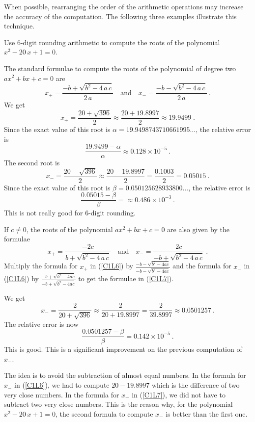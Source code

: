 When possible, rearranging the order of the arithmetic operations may
increase the accuracy of the computation.  The following three examples
illustrate this technique.

\begin{egg}
Use $6$-digit rounding arithmetic to compute the roots of the
polynomial $x^2-20\,x+1=0$.

The standard formulae to compute the
roots of the polynomial of degree two $a x^2+b x+c=0$ are
\begin{equation}
x_{+} =\frac{-b+\sqrt{b^2-4\,a\,c}}{2\,a}
\quad \text{and} \quad
x_{-} =\frac{-b-\sqrt{b^2-4\,a\,c}}{2\,a}  \ . \label{C1L6}
\end{equation}
We get
\[
x_{+}=\frac{20+\sqrt{396}}{2} \approx \frac{20+19.8997}{2}
\approx 19.9499 \; .
\]
Since the exact value of this root is
$\alpha = 19.9498743710661995\ldots$, the relative error is
\[
\frac{19.9499 - \alpha}{\alpha} \approx 0.128 \times 10^{-5} \ .
\]
The second root is
\[
x_{-}=\frac{20-\sqrt{396}}{2} \approx
\frac{20-19.8997}{2} = \frac{0.1003}{2} = 0.05015 \ .
\]
Since the exact value of this root is $\beta =
0.050125628933800\ldots$, the relative error is
\[
\frac{0.05015 - \beta}{\beta} =\approx 0.486 \times 10^{-3} \ .
\]
This is not really good for $6$-digit rounding.

If $c\neq 0$, the roots of the polynomial $a x^2+b x+c=0$ are also
given by the formulae
\begin{equation}
x_{+} = \frac{-2c}{b+\sqrt{b^2-4\,a\,c}} \quad \text{and} \quad
x_{-} = \frac{2c}{-b+\sqrt{b^2-4\,a\,c}} \ .  \label{C1L7}
\end{equation}
Multiply the formula for $x_{+}$ in (\ref{C1L6}) by
$\displaystyle \frac{-b-\sqrt{b^2-4ac}}{-b-\sqrt{b^2-4ac}}$ and the
formula for $x_{-}$ in (\ref{C1L6}) by
$\displaystyle \frac{-b+\sqrt{b^2-4ac}}{-b+\sqrt{b^2-4ac}}$ to get the
formulae in (\ref{C1L7}).

We get
\[
x_{-} = \frac{2}{20+\sqrt{396}} \approx \frac{2}{20+19.8997}
= \frac{2}{39.8997} \approx 0.0501257 \ .
\]
The relative error is now
\[
\frac{0.0501257 - \beta}{\beta} = 0.142 \times 10^{-5} \ .
\]
This is good.  This is a significant improvement on the previous
computation of $x_{-}$.

The idea is to avoid the subtraction of almost equal numbers.  In
the formula for $x_{-}$ in (\ref{C1L6}), we had to
compute $20-19.8997$ which is the difference of two very close numbers.
In the formula for $x_{-}$ in (\ref{C1L7}), we did not have to
subtract two very close numbers.  This is the reason why, for the polynomial
$x^2-20\,x+1=0$, the second formula to compute $x_-$ is better than
the first one.
\end{egg}


